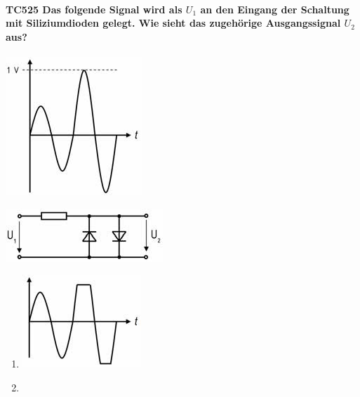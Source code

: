\documentclass[8pt]{article}
\begin{document}
\begin{enumerate}
\begin{enumerate}[nolistsep,label=\Alph*]
{\begin{enumerate}[nolistsep,label=\Alph*]
\paragraph*{TC525 Das folgende Signal wird als $U_{1}$ an den Eingang der Schaltung mit Siliziumdioden gelegt. Wie sieht das zugehörige Ausgangssignal $U_{2}$ aus?}
\begin{center}
	\begin{minipage}{\linewidth}
		\centering
		\includegraphics[scale=1.0]{pics/tc525_a.jpg}
	\end{minipage}
\end{center}
\begin{center}
	\begin{minipage}{\linewidth}
		\centering
		\includegraphics[scale=1.0]{pics/tc525_b.jpg}
	\end{minipage}
\end{center}
\begin{enumerate}[nolistsep,label=\Alph*]
\item
	\begin{center}
		\begin{minipage}{\linewidth}
			\centering
			\includegraphics[scale=1.0]{pics/tc525_c.jpg}
		\end{minipage}
	\end{center}
\item
	\begin{center}

\end{center}
\end{enumerate}
\end{enumerate}}
\end{enumerate}
\end{enumerate}
\end{document}
